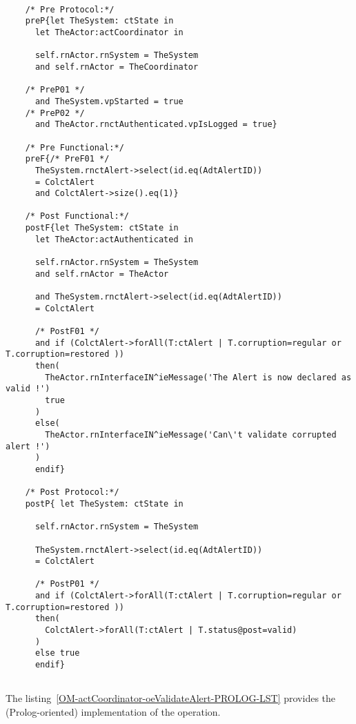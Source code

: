 	\scriptsize
	\vspace{0.5cm}
	\begin{lstlisting}[style=MessirStyle,firstnumber=auto,captionpos=b,caption={\msrmessir (MCL-oriented) specification of the operation \emph{oeValidateAlert}.},label=OM-actCoordinator-oeValidateAlert-MCL-LST]

	/* Pre Protocol:*/ 
	preP{let TheSystem: ctState in
	  let TheActor:actCoordinator in
	  
	  self.rnActor.rnSystem = TheSystem
	  and self.rnActor = TheCoordinator
	  
	/* PreP01 */
	  and TheSystem.vpStarted = true
	/* PreP02 */
	  and TheActor.rnctAuthenticated.vpIsLogged = true}
	
	/* Pre Functional:*/
	preF{/* PreF01 */
	  TheSystem.rnctAlert->select(id.eq(AdtAlertID))
	  = ColctAlert
	  and ColctAlert->size().eq(1)}
	
	/* Post Functional:*/ 
	postF{let TheSystem: ctState in
	  let TheActor:actAuthenticated in
	  
	  self.rnActor.rnSystem = TheSystem
	  and self.rnActor = TheActor
	  
	  and TheSystem.rnctAlert->select(id.eq(AdtAlertID))
	  = ColctAlert
	  
	  /* PostF01 */
	  and if (ColctAlert->forAll(T:ctAlert | T.corruption=regular or T.corruption=restored ))
	  then(
		TheActor.rnInterfaceIN^ieMessage('The Alert is now declared as valid !')
		true
	  )
	  else(
		TheActor.rnInterfaceIN^ieMessage('Can\'t validate corrupted alert !')
	  )
	  endif}
	
	/* Post Protocol:*/ 
	postP{ let TheSystem: ctState in
	  
	  self.rnActor.rnSystem = TheSystem
	
	  TheSystem.rnctAlert->select(id.eq(AdtAlertID))
	  = ColctAlert
	  
	  /* PostP01 */
	  and if (ColctAlert->forAll(T:ctAlert | T.corruption=regular or T.corruption=restored ))
	  then(
		ColctAlert->forAll(T:ctAlert | T.status@post=valid)
	  )
	  else true
	  endif}
	
	\end{lstlisting}
	\normalsize 
	
	
	
	
	
	\vspace{1cm}
	The listing~\ref{OM-actCoordinator-oeValidateAlert-PROLOG-LST} provides the \msrmessir (Prolog-oriented) implementation of the operation.
	
	\scriptsize
	\vspace{0.5cm}
	
	
	\normalsize





